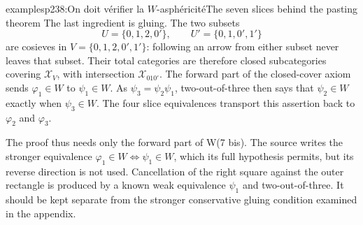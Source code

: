 \begin{dcomment}{examples}{p238:On doit vérifier la $W$-asphéricité}{The seven slices behind the pasting theorem}
The last ingredient is gluing. The two subsets
\[
 U=\{0,1,2,0'\},\qquad
 U'=\{0,1,0',1'\}
\]
are cosieves in $V=\{0,1,2,0',1'\}$: following an arrow from either subset never leaves that subset. Their total categories are therefore closed subcategories covering $\mathcal X_V$, with intersection $\mathcal X_{010'}$. The forward part of the closed-cover axiom sends $\varphi_1\in W$ to $\psi_1\in W$. As $\psi_3=\psi_2\psi_1$, two-out-of-three then says that $\psi_2\in W$ exactly when $\psi_3\in W$. The four slice equivalences transport this assertion back to $\varphi_2$ and $\varphi_3$.

The proof thus needs only the forward part of W(7 bis). The source writes the stronger equivalence $\varphi_1\in W\Longleftrightarrow\psi_1\in W$, which its full hypothesis permits, but its reverse direction is not used. Cancellation of the right square against the outer rectangle is produced by a known weak equivalence $\psi_1$ and two-out-of-three. It should be kept separate from the stronger conservative gluing condition examined in the appendix.
\end{dcomment}

